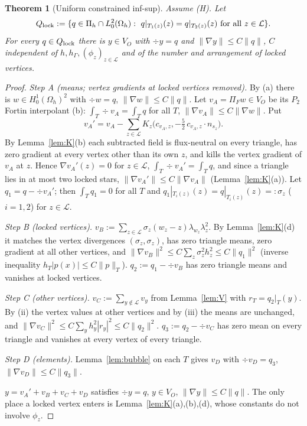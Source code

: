 \documentclass[11pt]{article}
\newtheorem{theorem}{Theorem}
\theoremstyle{remark}
\newcommand{\hG}{h_\Gamma}
\newcommand{\VO}{V_O}
\newcommand{\Pih}{\Pi_h}
\newcommand{\Lk}{\mathcal L}
\newcommand{\norm}[1]{\|#1\|}
\newcommand{\Ql}{Q_{\rm lock}}
\begin{document}
\begin{theorem}[Uniform constrained inf-sup]\label{thm:L}
Assume (H). Let
\[\Ql:=\{q\in\Pih\cap L^2_0(\Omega_h):\ q|_{T_1(z)}(z)=q|_{T_2(z)}(z)\ \text{for all }z\in\Lk\}.\]
For every $q\in\Ql$ there is $y\in\VO$ with $\div y=q$ and $\norm{\nabla y}\le C\norm q$, $C$ independent of
$h,\hG,(\phi_z)_{z\in\Lk}$ and of the number and arrangement of locked vertices.
\end{theorem}
\begin{proof}
\emph{Step A (means; vertex gradients at locked vertices removed).}
By (a) there is $w\in H^1_0(\Omega_h)^2$ with $\div w=q$, $\norm{\nabla w}\le C\norm q$. Let $v_A=\Pi_Fw\in\VO$ be its
$P_2$ Fortin interpolant (b): $\int_T\div v_A=\int_Tq$ for all $T$, $\norm{\nabla v_A}\le C\norm{\nabla w}$. Put
\[v_A'=v_A-\sum_{z\in\Lk}K_z\big(c_{v_A,z},-\tfrac52\,c_{v_A,z}\cdot n_{s_z}\big).\]
By Lemma~\ref{lem:K}(b) each subtracted field is flux-neutral on every triangle, has zero gradient at every vertex
other than its own $z$, and kills the vertex gradient of $v_A$ at $z$. Hence $\nabla v_A'(z)=0$ for $z\in\Lk$,
$\int_T\div v_A'=\int_Tq$, and since a triangle lies in at most two locked stars,
$\norm{\nabla v_A'}\le C\norm{\nabla v_A}$ (Lemma~\ref{lem:K}(a)). Let $q_1=q-\div v_A'$; then
$\int_Tq_1=0$ for all $T$ and $q_1|_{T_i(z)}(z)=q|_{T_i(z)}(z)=:\sigma_z$ ($i=1,2$) for $z\in\Lk$.

\emph{Step B (locked vertices).} $v_B:=\sum_{z\in\Lk}\sigma_z(w_z-z)\lambda_{w_z}\lambda_z^2$. By
Lemma~\ref{lem:K}(d) it matches the vertex divergences $(\sigma_z,\sigma_z)$, has zero triangle means, zero gradient
at all other vertices, and $\norm{\nabla v_B}^2\le C\sum_z\sigma_z^2h_z^2\le C\norm{q_1}^2$ (inverse inequality
$h_T|p(x)|\le C\norm p_T$). $q_2:=q_1-\div v_B$ has zero triangle means and vanishes at locked vertices.

\emph{Step C (other vertices).} $v_C:=\sum_{y\notin\Lk}v_y$ from Lemma~\ref{lem:V} with $r_T=q_2|_T(y)$. By (ii) the
vertex values at other vertices and by (iii) the means are unchanged, and
$\norm{\nabla v_C}^2\le C\sum_y h_y^2|r_y|^2\le C\norm{q_2}^2$. $q_3:=q_2-\div v_C$ has zero mean on every
triangle and vanishes at every vertex of every triangle.

\emph{Step D (elements).} Lemma~\ref{lem:bubble} on each $T$ gives $v_D$ with $\div v_D=q_3$,
$\norm{\nabla v_D}\le C\norm{q_3}$.

$y=v_A'+v_B+v_C+v_D$ satisfies $\div y=q$, $y\in\VO$, $\norm{\nabla y}\le C\norm q$. The only place a locked vertex
enters is Lemma~\ref{lem:K}(a),(b),(d), whose constants do not involve $\phi_z$.
\end{proof}
\end{document}
